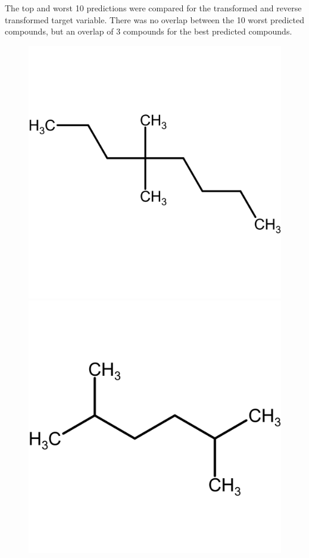 \documentclass[11pt, titlepage]{article}
\begin{document}
The top and worst 10 predictions were compared for the transformed and reverse transformed target variable. There was no overlap between the 10 worst predicted compounds, but an overlap of 3 compounds for the best predicted compounds. 

\begin{figure}[H]
	\centering
	\begin{minipage}{0.3\textwidth}
		\centering\small
		\includegraphics[width = 0.95\linewidth]{figures/HenryBest1.png}
	\end{minipage}
	\begin{minipage}{0.3\textwidth}
		\centering\small
		\includegraphics[width = 0.95\linewidth]{figures/HenryBest2.png}

\end{minipage}
\end{figure}
\end{document}

